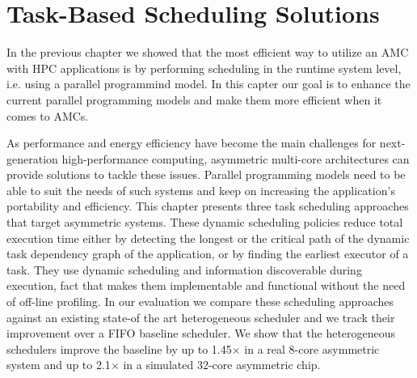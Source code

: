 \chapter{Task-Based Scheduling Solutions}

In the previous chapter we showed that the most efficient way to utilize an AMC with HPC applications is by performing scheduling in the runtime system level, i.e. using a parallel programmind model.
In this capter our goal is to enhance the current parallel programming models and make them more efficient when it comes to AMCs.

As performance and energy efficiency have become the main challenges for next-generation high-performance computing, asymmetric multi-core architectures can provide solutions to tackle these issues.
Parallel programming models need to be able to suit the needs of such systems and keep on increasing the application's portability and efficiency.
This chapter presents three task scheduling approaches that target asymmetric systems.
These dynamic scheduling policies reduce total execution time either by detecting the longest or the critical path of the dynamic task dependency graph of the application, or by finding the earliest executor of a task.
They use dynamic scheduling and information discoverable during execution, fact that makes them implementable and functional without the need of off-line profiling.
In our evaluation we compare these scheduling approaches against an existing state-of the art heterogeneous scheduler and we track their improvement over a FIFO baseline scheduler.
We show that the heterogeneous schedulers improve the baseline by up to 1.45$\times$ in a real 8-core asymmetric system and up to 2.1$\times$ in a simulated 32-core asymmetric chip.

\newpage





%



%




